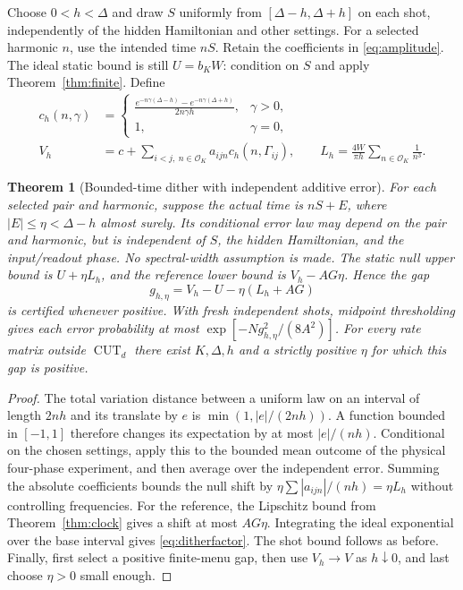 \documentclass[11pt,a4paper]{article}
\newtheorem{theorem}{Theorem}[section]
\theoremstyle{remark}\newtheorem{remark}[theorem]{Remark}
\newcommand{\CUT}{\operatorname{CUT}}
\begin{document}
Choose $0<h<\Delta$ and draw $S$ uniformly from
$[\Delta-h,\Delta+h]$ on each shot, independently of the hidden
Hamiltonian and other settings. For a selected harmonic $n$, use the
intended time $nS$. Retain the coefficients in \eqref{eq:amplitude}.
The ideal static bound is still $U=b_KW$: condition on $S$ and apply
Theorem~\ref{thm:finite}. Define
\begin{align}
 c_h(n,\gamma)&=
 \begin{cases}
 \displaystyle\frac{e^{-n\gamma(\Delta-h)}-
 e^{-n\gamma(\Delta+h)}}{2n\gamma h},&\gamma>0,\\
 1,&\gamma=0,
 \end{cases}\label{eq:ditherfactor}\\
 V_h&=c+\sum_{i<j,\ n\in\mathcal O_K}a_{ijn}c_h(n,\Gamma_{ij}),
 \qquad L_h=\frac{4W}{\pi h}\sum_{n\in\mathcal O_K}\frac1{n^3}.
 \label{eq:dithergap}
\end{align}

\begin{theorem}[Bounded-time dither with independent additive error]
\label{thm:dither}
For each selected pair and harmonic, suppose the actual time is $nS+E$,
where $|E|\leq\eta<\Delta-h$ almost surely. Its conditional error law
may depend on the pair and harmonic, but is independent of $S$, the
hidden Hamiltonian, and the input/readout phase. No spectral-width
assumption is made. The static null upper bound is $U+\eta L_h$, and
the reference lower bound is $V_h-AG\eta$. Hence the gap
\begin{equation}\label{eq:ditherrobust}
 g_{h,\eta}=V_h-U-\eta(L_h+AG)
\end{equation}
is certified whenever positive. With fresh independent shots, midpoint
thresholding gives each error probability at most
$\exp[-Ng_{h,\eta}^2/(8A^2)]$. For every rate matrix outside $\CUT_d$
there exist $K,\Delta,h$ and a strictly positive $\eta$ for which this
gap is positive.
\end{theorem}
\begin{proof}
The total variation distance between a uniform law on an interval of
length $2nh$ and its translate by $e$ is
$\min(1,|e|/(2nh))$. A function bounded in $[-1,1]$ therefore changes
its expectation by at most $|e|/(nh)$. Conditional on the chosen
settings, apply this to the bounded mean outcome of the physical
four-phase experiment, and then average over the independent error.
Summing the absolute coefficients bounds the null shift by
$\eta\sum|a_{ijn}|/(nh)=\eta L_h$ without controlling frequencies.
For the reference, the Lipschitz bound from Theorem~\ref{thm:clock}
gives a shift at most $AG\eta$. Integrating the ideal exponential over
the base interval gives \eqref{eq:ditherfactor}. The shot bound follows
as before. Finally, first select a positive finite-menu gap, then use
$V_h\to V$ as $h\downarrow0$, and last choose $\eta>0$ small enough.
\end{proof}
\end{document}
